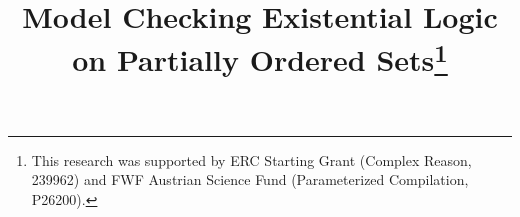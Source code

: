 \documentclass[usletter]{article}
\newcommand{\shortversion}[1]{}
\begin{document}
\shortversion{
\special{papersize=8.5in,11in}
\setlength{\pdfpageheight}{\paperheight}
\setlength{\pdfpagewidth}{\paperwidth}

\conferenceinfo{CSL-LICS 2014}{July 14--18, 2014, Vienna, Austria}
\copyrightyear{2014}
\copyrightdata{978-1-4503-2886-9}
\doi{nnnnnnn.nnnnnnn}









\titlebanner{banner above paper title}        \preprintfooter{short description of paper}   }

\title{Model Checking Existential Logic on Partially Ordered Sets\footnote{This research was supported by ERC Starting Grant (Complex Reason, 239962) 
and FWF Austrian Science Fund (Parameterized Compilation, P26200).}}
\end{document}
